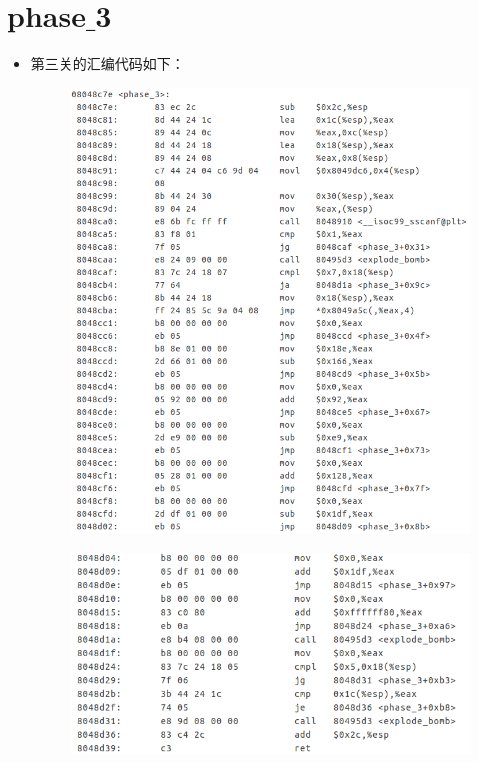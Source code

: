 \section{phase$\_$3}
	\begin{itemize}
	\item
	第三关的汇编代码如下：
	\begin{figure}[h]
		\centering
			\includegraphics[scale=0.73]{images/phase_3.png}
	\end{figure}
	
	\newpage

	\begin{figure}[h]
		\centering
			\includegraphics[scale=0.73]{images/phase_3_1.png}
	\end{figure}
	

\end{itemize}
